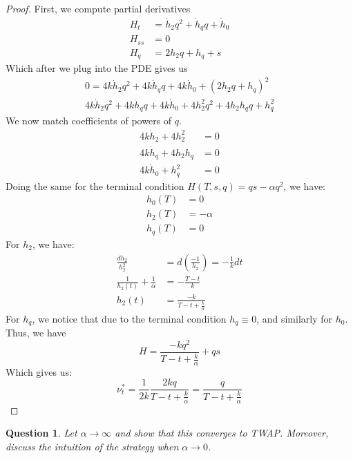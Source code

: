 \documentclass{amsart}
\newtheorem{theorem}{Question}[section]
\begin{document}
\begin{proof}
    First, we compute partial derivatives
    \begin{align*}
        H_t &= \dot{h}_2 q^2 + \dot{h}_q q + \dot{h}_0 \\
        H_{ss} &= 0 \\
        H_q &= 2 h_2 q + h_q + s
    \end{align*}
    Which after we plug into the PDE gives us
    \begin{align*}
    0 = 4k\dot{h}_2 q^2 + 4k \dot{h}_qq + 4k \dot{h}_0 + (2 h_2 q + h_q)^2 \\
    4k\dot{h}_2 q^2 + 4k \dot{h}_qq + 4k \dot{h}_0 + 4 h_2^2 q^2 + 4h_2 h_q q + h_q^2 
    \end{align*}
    We now match coefficients of powers of $q$. 
    \begin{align*}
        4k \dot{h}_2 + 4 h_2^2 &= 0 \\
        4k \dot{h}_q + 4h_2 h_q &= 0 \\
        4k \dot{h}_0 + h_q^2 &= 0
    \end{align*}
    Doing the same for the terminal condition $H(T, s, q) = qs - \alpha q^2$, we have: 
    \begin{align*}
        h_0(T) &= 0 \\
        h_2(T) &= -\alpha \\
        h_q(T) &= 0
    \end{align*}
    For $h_2$, we have: 
    \begin{align*}
        \frac{dh_2}{h_2^2} &= d \left(\frac{-1}{h_2}\right) = -\frac1{k}dt\\ 
        \frac{1}{h_2(t)} + \frac1{\alpha} &= - \frac{T - t}{k}\\
        h_2(t) &= \frac{-k}{T - t + \frac{k}{\alpha}}
    \end{align*}
    For $h_q$, we notice that due to the terminal condition $h_q \equiv 0$, and similarly for $h_0$. 
    Thus, we have 
    \[
    H = \frac{-kq^2}{T - t + \frac{k}{\alpha}} + qs
    \] 
    Which gives us: 
    \[
    \nu_t^\ast = \frac{1}{2k} \frac{2kq}{T - t + \frac{k}{\alpha}} = \frac{q}{T - t + \frac{k}{\alpha}}
    \]
\end{proof}
\begin{theorem}
   Let $\alpha \to \infty$ and show that this converges to TWAP. Moreover, discuss the intuition of the strategy when $\alpha \to 0$.  
\end{theorem}
\end{document}
